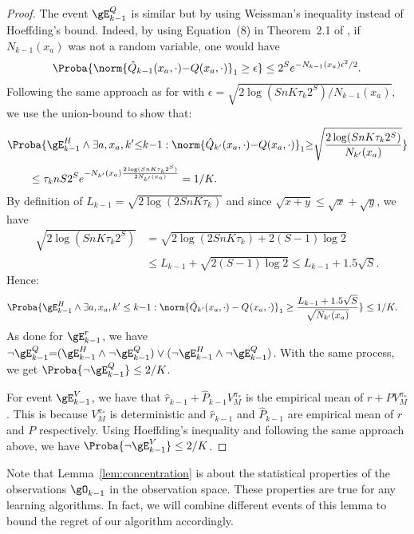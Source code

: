 \begin{subappendices}
\begin{proof}
    The event $\gE_{k-1}^Q$ is similar but by using Weissman's inequality \cite{weissman2003inequalities} instead of Hoeffding's bound. Indeed, by using Equation~(8) in Theorem~2.1 of \cite{weissman2003inequalities}, if $N_{k-1}(x_a)$ was not a random variable, one would have 
    \begin{align*}
        \Proba{\norm{\hat{Q}_{k-1}(x_a,\cdot){-}Q(x_a,\cdot)}_1\ge \epsilon} \le 2^S e^{- N_{k-1}(x_a) \epsilon^2/2}.
    \end{align*}
    Following the same approach as for  with $\epsilon=\sqrt{2\log(SnK\tau_k2^S)/N_{k-1}(x_a)}$, we use the union-bound to show that:
    \begin{align*}
        &\Proba{\gE_{k-1}^H\land\exists a, x_a, k'{\le}k{-}1: \norm{\hat{Q}_{k'}(x_a,\cdot){-}Q(x_a,\cdot)}_1 {\ge} \sqrt{\frac{2\log(SnK\tau_k 2^S)}{N_{k'}(x_a)}}} \\
        &\qquad \le \tau_k n S 2^Se^{ -N_{k'}(x_a)\frac{2\log(SnK\tau_k2^S)}{2N_{k'}(x_a)}} = 1/K.
    \end{align*}
    By definition of $L_{k-1}=\sqrt{2\log(2SnK\tau_k)}$ and since $\sqrt{x+y}\le\sqrt{x}+\sqrt{y}$, we have
    \begin{align*}
      \sqrt{2\log(SnK\tau_k2^S)}
      &=\sqrt{2\log(2SnK\tau_k) {+} 2(S-1)\log 2}\\
      & \le L_{k-1} +\sqrt{2(S-1)\log2} \le L_{k-1} + 1.5\sqrt{S}.
    \end{align*}
    Hence: 
    \begin{align*}
        &\Proba{\gE_{k-1}^H\land\exists a, x_a, k'\le k{-}1: \norm{\hat{Q}_{k'}(x_a,\cdot)-Q_{}(x_a,\cdot)}_1 \ge \frac{L_{k-1}+1.5\sqrt{S}}{\sqrt{N_{k'}(x_a)}}} \le 1/K.
    \end{align*}
    As done for $\gE^r_{k-1}$, we have $\lnot \gE_{k-1}^Q {=}(\gE_{k-1}^H \land \lnot \gE_{k-1}^Q) \lor (\lnot \gE_{k-1}^H \land \lnot \gE_{k-1}^Q)$. With the same process, we get $\Proba{\lnot \gE_{k-1}^Q}\le 2/K$.
        
    For event $\gE_{k-1}^V$, we have that $\hat{r}_{k-1}+\hat{P}_{k-1}V_M^{\pi_*}$ is the empirical mean of $r+PV_M^{\pi_*}$.
    This is because $V_M^{\pi_*}$ is deterministic and $\hat{r}_{k-1}$ and $\hat{P}_{k-1}$ are empirical mean of $r$ and $P$ respectively.
    Using Hoeffding's inequality and following the same approach above, we have $\Proba{\neg \gE_{k-1}^V}\le 2/K$.
\end{proof}
Note that Lemma~\ref{lem:concentration} is about the statistical properties of the observations $\gO_{k-1}$ in the observation space.
These properties are true for any learning algorithms.
In fact, we will combine different events of this lemma to bound the regret of our algorithm accordingly.


\end{subappendices}

